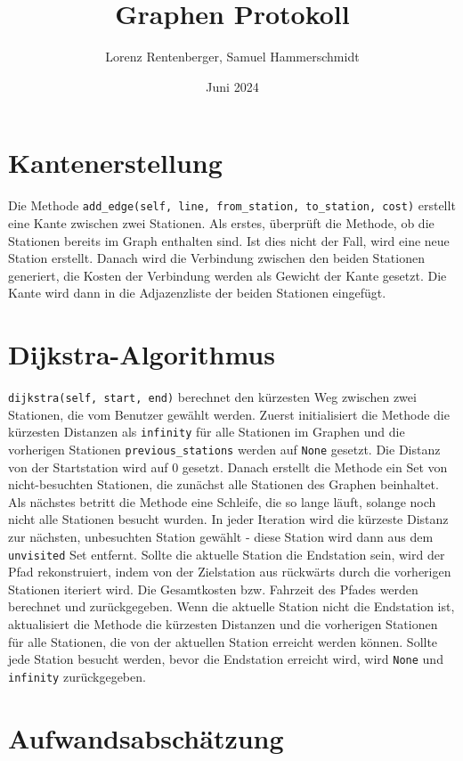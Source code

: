 \documentclass{article}
\title{Graphen Protokoll}
\author{Lorenz Rentenberger, Samuel Hammerschmidt}
\date{Juni 2024}
\begin{document}
\maketitle

\section*{Kantenerstellung}
Die Methode \texttt{add\_edge(self, line, from\_station, to\_station, cost)} erstellt eine Kante zwischen zwei Stationen. Als erstes, überprüft die Methode, ob die Stationen bereits im Graph enthalten sind. Ist dies nicht der Fall, wird eine neue Station erstellt.
Danach wird die Verbindung zwischen den beiden Stationen generiert, die Kosten der Verbindung werden als Gewicht der Kante gesetzt. Die Kante wird dann in die Adjazenzliste der beiden Stationen eingefügt.

\section*{Dijkstra-Algorithmus}
\texttt{dijkstra(self, start, end)} berechnet den kürzesten Weg zwischen zwei Stationen, die vom Benutzer gewählt werden. Zuerst initialisiert die Methode die kürzesten Distanzen als \texttt{infinity} für alle Stationen im Graphen und die vorherigen Stationen \texttt{previous\_stations} werden auf \texttt{None} gesetzt.
Die Distanz von der Startstation wird auf 0 gesetzt. Danach erstellt die Methode ein Set von nicht-besuchten Stationen, die zunächst alle Stationen des Graphen beinhaltet. Als nächstes betritt die Methode eine Schleife, die so lange läuft, solange noch nicht alle Stationen besucht wurden. In jeder Iteration wird die kürzeste Distanz zur nächsten, unbesuchten Station gewählt - diese Station wird dann aus dem \texttt{unvisited} Set entfernt.
Sollte die aktuelle Station die Endstation sein, wird der Pfad rekonstruiert, indem von der Zielstation aus rückwärts durch die vorherigen Stationen iteriert wird. Die Gesamtkosten bzw. Fahrzeit des Pfades werden berechnet und zurückgegeben.
Wenn die aktuelle Station nicht die Endstation ist, aktualisiert die Methode die kürzesten Distanzen und die vorherigen Stationen für alle Stationen, die von der aktuellen Station erreicht werden können. Sollte jede Station besucht werden, bevor die Endstation erreicht wird, wird \texttt{None} und \texttt{infinity} zurückgegeben.

\section*{Aufwandsabschätzung}
\end{document}
